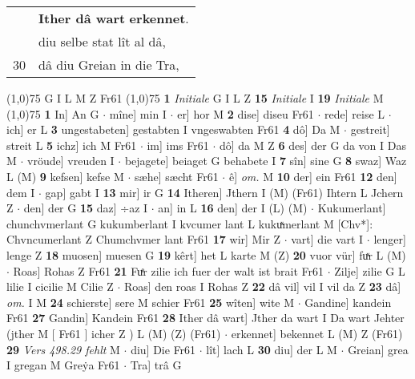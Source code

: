 \documentclass[8pt,a4paper,notitlepage]{article}
\begin{document}
\begin{table}[ht]
\begin{minipage}[t]{0.5\linewidth}
\begin{tabular}{rl}
 & \textbf{Ither dâ wart} \textbf{erkennet}.\\ 
 & diu selbe stat lît al dâ,\\ 
30 & dâ diu Greian in die Tra,\\ 
\end{tabular}
\scriptsize
\line(1,0){75} \newline
G I L M Z Fr61 \newline
\line(1,0){75} \newline
\textbf{1} \textit{Initiale} G I L Z  \textbf{15} \textit{Initiale} I  \textbf{19} \textit{Initiale} M  \newline
\line(1,0){75} \newline
\textbf{1} In] An G  $\cdot$ mîne] min I  $\cdot$ er] hor M \textbf{2} dise] diseu Fr61  $\cdot$ rede] reise L  $\cdot$ ich] er L \textbf{3} ungestabeten] gestabten I vngeswabten Fr61 \textbf{4} dô] Da M  $\cdot$ gestreit] streit L \textbf{5} ichz] ich M Fr61  $\cdot$ im] ims Fr61  $\cdot$ dô] da M Z \textbf{6} des] der G da von I Das M  $\cdot$ vröude] vreuden I  $\cdot$ bejagete] beiaget G behabete I \textbf{7} sîn] sine G \textbf{8} swaz] Waz L (M) \textbf{9} kefsen] kefse M  $\cdot$ sæhe] sæcht Fr61  $\cdot$ ê] \textit{om.} M \textbf{10} der] ein Fr61 \textbf{12} den] dem I  $\cdot$ gap] gabt I \textbf{13} mir] ir G \textbf{14} Itheren] Jthern I (M) (Fr61) Ihtern L Jchern Z  $\cdot$ den] der G \textbf{15} daz] ÷az I  $\cdot$ an] in L \textbf{16} den] der I (L) (M)  $\cdot$ Kukumerlant] chunchvmerlant G kukumberlant I kvcumer lant L kukuͯmerlant M [Chv*]: Chvncumerlant Z Chumchvmer lant Fr61 \textbf{17} wir] Mir Z  $\cdot$ vart] die vart I  $\cdot$ lenger] lenge Z \textbf{18} muosen] muesen G \textbf{19} kêrt] het L karte M (Z) \textbf{20} vuor vür] fuͯr L (M)  $\cdot$ Roas] Rohas Z Fr61 \textbf{21} Fuͤr zilie ich fuer der walt ist brait Fr61  $\cdot$ Zilje] zilie G L lilie I cicilie M Cilie Z  $\cdot$ Roas] den roas I Rohas Z \textbf{22} dâ vil] vil I vil da Z \textbf{23} dâ] \textit{om.} I M \textbf{24} schierste] sere M schier Fr61 \textbf{25} wîten] wite M  $\cdot$ Gandine] kandein Fr61 \textbf{27} Gandin] Kandein Fr61 \textbf{28} Ither dâ wart] Jther da wart I Da wart Jehter (jther M [ Fr61 ] icher Z ) L (M) (Z) (Fr61)  $\cdot$ erkennet] bekennet L (M) Z (Fr61) \textbf{29} \textit{Vers 498.29 fehlt} M   $\cdot$ diu] Die Fr61  $\cdot$ lît] lach L \textbf{30} diu] der L M  $\cdot$ Greian] grea I gregan M Greẏa Fr61  $\cdot$ Tra] trâ G \newline
\end{minipage}
\hspace{0.5cm}

\end{table}
\end{document}
